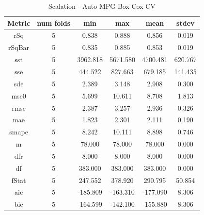 \documentclass{article}
\begin{document}
\begin{table}[H]
\centering
\caption{Scalation - Auto MPG Box-Cox CV}
\label{tab:Scalation - Auto MPG Box-Cox CV}
\begin{tabular}{|c|c|c|c|c|c|}\hline
Metric & num folds & min & max & mean & stdev \\ \hline \hline
rSq & 5 & 0.838 & 0.888 & 0.856 & 0.019 \\ \hline
rSqBar & 5 & 0.835 & 0.885 & 0.853 & 0.019 \\ \hline
sst & 5 & 3962.818 & 5671.580 & 4700.481 & 620.767 \\ \hline
sse & 5 & 444.522 & 827.663 & 679.185 & 141.435 \\ \hline
sde & 5 & 2.389 & 3.148 & 2.908 & 0.300 \\ \hline
mse0 & 5 & 5.699 & 10.611 & 8.708 & 1.813 \\ \hline
rmse & 5 & 2.387 & 3.257 & 2.936 & 0.326 \\ \hline
mae & 5 & 1.823 & 2.301 & 2.111 & 0.190 \\ \hline
smape & 5 & 8.242 & 10.111 & 8.898 & 0.746 \\ \hline
m & 5 & 78.000 & 78.000 & 78.000 & 0.000 \\ \hline
dfr & 5 & 8.000 & 8.000 & 8.000 & 0.000 \\ \hline
df & 5 & 383.000 & 383.000 & 383.000 & 0.000 \\ \hline
fStat & 5 & 247.552 & 378.920 & 290.795 & 50.854 \\ \hline
aic & 5 & -185.809 & -163.310 & -177.090 & 8.306 \\ \hline
bic & 5 & -164.599 & -142.100 & -155.880 & 8.306 \\ \hline
\end{tabular}
\end{table}
\end{document}

